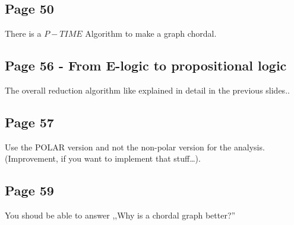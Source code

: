 \documentclass[a4paper]{article}
\begin{document}
\subsection{Page 50}
There is a $P-TIME$ Algorithm to make a graph chordal.


\subsection{Page 56 - From E-logic to propositional logic}

The overall reduction algorithm like explained in detail in the previous
slides..


\subsection{Page 57}
Use the POLAR version and not the non-polar version for the analysis.
(Improvement, if you want to implement that stuff\ldots).


\subsection{Page 59}

You shoud be able to answer ,,Why is a chordal graph better?''
\end{document}
